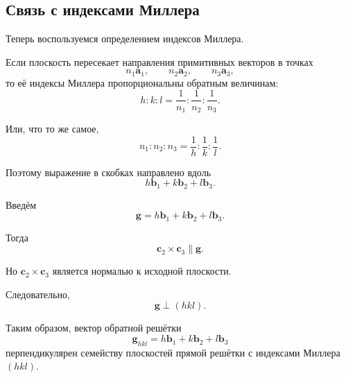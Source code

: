\documentclass[../final.tex]{subfiles}
\begin{document}

\subsection*{Связь с индексами Миллера}

Теперь воспользуемся определением индексов Миллера.

Если плоскость пересекает направления примитивных векторов
в точках
%
\begin{equation*}
    n_1\mathbf a_1,
    \qquad
    n_2\mathbf a_2,
    \qquad
    n_3\mathbf a_3,
\end{equation*}
%
то её индексы Миллера пропорциональны обратным величинам:
%
\begin{equation*}
    h:k:l
    =
    \frac{1}{n_1}
    :
    \frac{1}{n_2}
    :
    \frac{1}{n_3}.
\end{equation*}

Или, что то же самое,
%
\begin{equation*}
    n_1:n_2:n_3
    =
    \frac{1}{h}
    :
    \frac{1}{k}
    :
    \frac{1}{l}.
\end{equation*}

Поэтому выражение в скобках направлено вдоль
%
\begin{equation*}
    h\mathbf b_1
    +
    k\mathbf b_2
    +
    l\mathbf b_3.
\end{equation*}

Введём
%
\begin{equation*}
    \boxed{
        \mathbf g
        =
        h\mathbf b_1
        +
        k\mathbf b_2
        +
        l\mathbf b_3
    }.
\end{equation*}

Тогда
%
\begin{equation*}
    \mathbf c_2\times\mathbf c_3
    \parallel
    \mathbf g.
\end{equation*}

Но $\mathbf c_2\times\mathbf c_3$ является нормалью
к исходной плоскости.

Следовательно,
%
\begin{equation*}
    \boxed{
        \mathbf g\perp(hkl)
    }.
\end{equation*}

Таким образом, вектор обратной решётки
%
\begin{equation*}
    \boxed{
        \mathbf g_{hkl}
        =
        h\mathbf b_1
        +
        k\mathbf b_2
        +
        l\mathbf b_3
    }
\end{equation*}
%
перпендикулярен семейству плоскостей прямой решётки
с индексами Миллера $(hkl)$.
\end{document}
